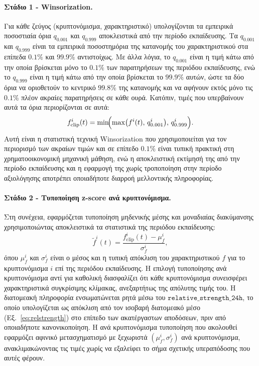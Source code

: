 \paragraph{Στάδιο 1 - Winsorization.}
Για κάθε ζεύγος (κρυπτονόμισμα, χαρακτηριστικό) υπολογίζονται τα εμπειρικά
ποσοστιαία όρια $q_{0{.}001}$ και $q_{0{.}999}$ αποκλειστικά από την περίοδο
εκπαίδευσης. Τα $q_{0{.}001}$ και $q_{0{.}999}$ είναι τα εμπειρικά ποσοστημόρια
της κατανομής του χαρακτηριστικού στα επίπεδα $0{.}1\%$ και $99{.}9\%$
αντιστοίχως. Με άλλα λόγια, το $q_{0{.}001}$ είναι η τιμή κάτω από την οποία
βρίσκεται μόνο το $0{.}1\%$ των παρατηρήσεων της περιόδου εκπαίδευσης, ενώ το
$q_{0{.}999}$ είναι η τιμή κάτω από την οποία βρίσκεται το $99{.}9\%$ αυτών,
ώστε τα δύο όρια να οριοθετούν το κεντρικό $99{.}8\%$ της κατανομής και να
αφήνουν εκτός μόνο τις $0{.}1\%$ πλέον ακραίες παρατηρήσεις σε κάθε ουρά.
Κατόπιν, τιμές που υπερβαίνουν αυτά τα όρια περιορίζονται σε αυτά:
\begin{equation}
  f^{i}_{\mathrm{clip}}(t) = \min\!\Bigl(\max\bigl(f^{i}(t),\, q^{i}_{0{.}001}\bigr),\, q^{i}_{0{.}999}\Bigr).
  \label{eq:winsor}
\end{equation}
Αυτή είναι η στατιστική τεχνική Winsorization που χρησιμοποιείται για τον περιορισμό των ακραίων τιμών
και σε επίπεδο $0{.}1\%$ είναι τυπική πρακτική στη
χρηματοοικονομική μηχανική μάθηση, ενώ η αποκλειστική εκτίμησή
της από την περίοδο εκπαίδευσης και η εφαρμογή της χωρίς τροποποίηση στην
περίοδο αξιολόγησης αποτρέπει οποιαδήποτε διαρροή μελλοντικής πληροφορίας.

\paragraph{Στάδιο 2 - Τυποποίηση z-score ανά κρυπτονόμισμα.}
Στη συνέχεια, εφαρμόζεται τυποποίηση μηδενικής μέσης και μοναδιαίας διακύμανσης
χρησιμοποιώντας αποκλειστικά τα στατιστικά της περιόδου εκπαίδευσης:
\begin{equation}
  \tilde{f}^{i}(t) = \frac{f^{i}_{\mathrm{clip}}(t) - \mu^{i}_{f}}{\sigma^{i}_{f}},
  \label{eq:zscore}
\end{equation}
όπου $\mu^{i}_{f}$ και $\sigma^{i}_{f}$ είναι ο μέσος και η τυπική απόκλιση
του χαρακτηριστικού $f$ για το κρυπτονόμισμα $i$ επί της περιόδου εκπαίδευσης.
Η επιλογή τυποποίησης ανά κρυπτονόμισμα αντί για καθολική διασφαλίζει
ότι κάθε κρυπτονόμισμα συνεισφέρει χαρακτηριστικά συγκρίσιμης κλίμακας,
ανεξαρτήτως της απόλυτης τιμής του. Η διατομεακή
πληροφορία ενσωματώνεται ρητά μέσω του $\mathtt{relative\_strength\_24h}$, το
οποίο υπολογίζεται ως απόκλιση από τον ισοβαρή διατομεακό μέσο
(Εξ.~\ref{eq:relstrength}) στο επίπεδο των ακατέργαστων αποδόσεων, πριν από
οποιαδήποτε κανονικοποίηση. Η ανά κρυπτονόμισμα τυποποίηση που ακολουθεί
εφαρμόζει αφινικό μετασχηματισμό με ξεχωριστά $(\mu^i_f, \sigma^i_f)$ ανά
κρυπτονόμισμα, ανακλιμακώνοντας τις τιμές χωρίς να εξαλείφει το σήμα
σχετικής υπεραπόδοσης που αυτές φέρουν.

